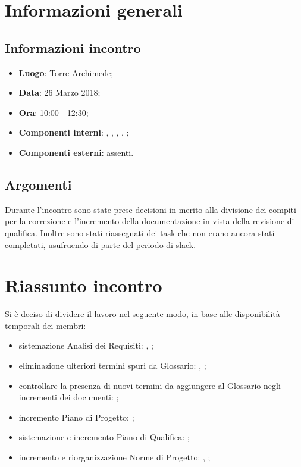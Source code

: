 \section{Informazioni generali}
\subsection{Informazioni incontro}
\begin{itemize}
\item \textbf{Luogo}: Torre Archimede;
\item \textbf{Data}: 26 Marzo 2018;
\item \textbf{Ora}: 10:00 - 12:30;
\item \textbf{Componenti interni}: \Tommaso, \Mattia, \Luca, \Cristian, \Isacco;
\item \textbf{Componenti esterni}: assenti.
\end{itemize}

\subsection{Argomenti}
Durante l'incontro sono state prese decisioni in merito alla divisione dei compiti per la correzione e l'incremento della documentazione in vista della revisione di qualifica. Inoltre sono stati riassegnati dei task che non erano ancora stati completati, usufruendo di parte del periodo di slack.

\section{Riassunto incontro}
Si è deciso di dividere il lavoro nel seguente modo, in base alle disponibilità temporali dei membri:
\begin{itemize}
    \item sistemazione Analisi dei Requisiti: \Cristian{}, \Tommaso{};
    \item eliminazione ulteriori termini spuri da Glossario: \Isacco{}, \Carlo{};
    \item controllare la presenza di nuovi termini da aggiungere al Glossario negli incrementi dei documenti: \Isacco{};
    \item incremento Piano di Progetto: \Mattia{};
    \item sistemazione e incremento Piano di Qualifica: \Leonardo{};
    \item incremento e riorganizzazione Norme di Progetto: \Isacco{}, \Carlo{};
\end{itemize}

